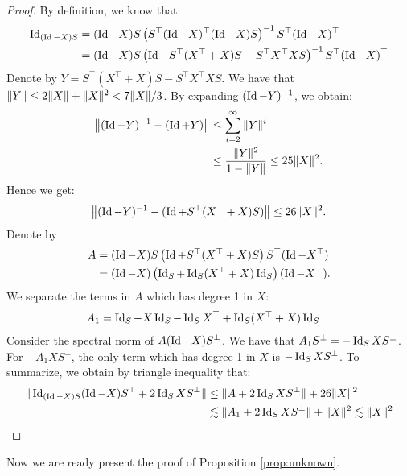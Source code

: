 \begin{proof}
	By definition, we know that:
	\begin{align}
		\operatorname{Id}_{(\operatorname{Id} - X) S} &= (\operatorname{Id} - X) S \left( S^{\top}(\operatorname{Id} - X)^{\top} (\operatorname{Id} - X) S \right)^{-1}  S^{\top}(\operatorname{Id} - X)^{\top}	\nonumber \\
		&= (\operatorname{Id} - X) S \left(\operatorname{Id} - S^{\top} (X^{\top}  + X) S  + S^{\top} X^{\top} X S \right)^{-1} S^{\top}(\operatorname{Id} - X)^{\top} \label{eq_reduction}
	\end{align}
	Denote by $Y = S^{\top} (X^{\top} + X) S - S^{\top} X^{\top} X S$.
	We have that $\|Y\|\le 2 \|X\| + \|X\|^2 < 7 \|X\| / 3 $.
	By expanding $(\operatorname{Id} - Y)^{-1}$, we obtain:
	\begin{align*}
		\left\|(\operatorname{Id} - Y)^{-1} - (\operatorname{Id} + Y)\right\|
		&\le \sum_{i=2}^{\infty} \|Y\|^i \\
		&\le \frac {\|Y\|^2} {1 - \|Y\|} \le 25 \|X\|^2.
	\end{align*}
	Hence we get:
	\[ \left\|(\operatorname{Id} - Y)^{-1} - (\operatorname{Id} + S^{\top} (X^{\top} + X) S)\right\| \le 26 \|X\|^2. \]
	Denote by
	\begin{align*}
		A &= (\operatorname{Id} - X) S \left(\operatorname{Id} + S^{\top} (X^{\top} + X) S\right) S^{\top} (\operatorname{Id} - X^{\top}) \\
			&= (\operatorname{Id} - X) \left(\operatorname{Id}_S + \operatorname{Id}_S (X^{\top} + X) \operatorname{Id}_S\right) (\operatorname{Id} - X^{\top}).
	\end{align*}
	We separate the terms in $A$ which has degree 1 in $X$:
	\begin{align*}
		A_1 &= \operatorname{Id}_S - X \operatorname{Id}_S - \operatorname{Id}_S X^{\top} + \operatorname{Id}_S (X^{\top} + X) \operatorname{Id}_S
	\end{align*}
	Consider the spectral norm of $A (\operatorname{Id} - X) S^{\bot}$.
	We have that $A_1 S^{\bot} = -\operatorname{Id}_S X S^{\bot}$.
	For $- A_1 X S^{\bot}$, the only term which has degree 1 in $X$ is $-\operatorname{Id}_S X S^{\bot}$.
	To summarize, we obtain by triangle inequality that:
	\begin{align*}
		\|\operatorname{Id}_{(\operatorname{Id} - X) S} (\operatorname{Id} - X) S^{\top} + 2\operatorname{Id}_S X S^{\bot}\|
		&\le \|A + 2\operatorname{Id}_S X S^{\bot}\| + 26 \|X\|^2 \\
		&\lesssim \|A_1 + 2\operatorname{Id}_S X S^{\bot}\| + \|X\|^2 \lesssim \|X\|^2
	\end{align*}
\end{proof}

\noindent Now we are ready present the proof of Proposition \ref{prop:unknown}.

